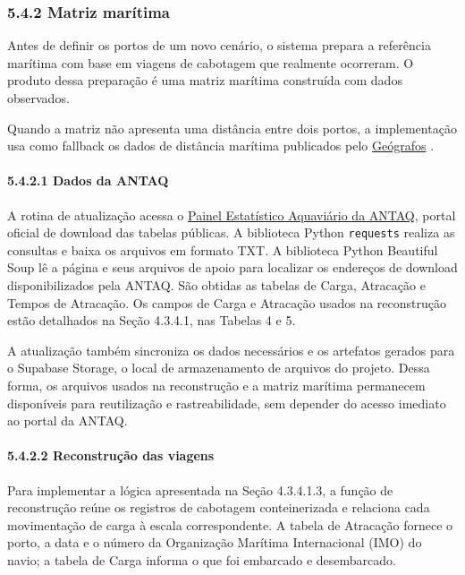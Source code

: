 \documentclass[brazil,]{article}
\let\oldsubsubsection\subsubsection
\renewcommand{\subsubsection}{\Needspace{10\baselineskip}\oldsubsubsection}
\let\oldparagraph\paragraph
\renewcommand{\paragraph}[1]{\Needspace{7\baselineskip}\oldparagraph{#1}\mbox{}}
\begin{document}
\hypertarget{matriz-maruxedtima}{%
\subsubsection{5.4.2 Matriz marítima}\label{matriz-maruxedtima}}

Antes de definir os portos de um novo cenário, o sistema prepara a
referência marítima com base em viagens de cabotagem que realmente
ocorreram. O produto dessa preparação é uma matriz marítima construída
com dados observados.

Quando a matriz não apresenta uma distância entre dois portos, a
implementação usa como fallback os dados de distância marítima publicados
pelo \href{https://www.geografos.com.br/}{Geógrafos}
\parencite{geografos2026}.

\hypertarget{dados-da-antaq}{%
\paragraph{5.4.2.1 Dados da ANTAQ}\label{dados-da-antaq}}

A rotina de atualização acessa o
\href{https://estatistica.antaq.gov.br/ea/sense/download.html}{Painel
Estatístico Aquaviário da ANTAQ}, portal oficial de download das tabelas
públicas. A biblioteca Python \texttt{requests} realiza as consultas e
baixa os arquivos em formato TXT. A biblioteca Python Beautiful Soup lê
a página e seus arquivos de apoio para localizar os endereços de
download disponibilizados pela ANTAQ. São obtidas as tabelas de Carga,
Atracação e Tempos de Atracação. Os campos de Carga e Atracação usados
na reconstrução estão detalhados na Seção 4.3.4.1, nas Tabelas 4 e 5.

A atualização também sincroniza os dados necessários e os artefatos
gerados para o Supabase Storage, o local de armazenamento de arquivos do
projeto. Dessa forma, os arquivos usados na reconstrução e a matriz
marítima permanecem disponíveis para reutilização e rastreabilidade, sem
depender do acesso imediato ao portal da ANTAQ.

\hypertarget{reconstruuxe7uxe3o-das-viagens-1}{%
\paragraph{5.4.2.2 Reconstrução das
viagens}\label{reconstruuxe7uxe3o-das-viagens-1}}

Para implementar a lógica apresentada na Seção 4.3.4.1.3, a função de
reconstrução reúne os registros de cabotagem conteinerizada e relaciona
cada movimentação de carga à escala correspondente. A tabela de
Atracação fornece o porto, a data e o número da Organização Marítima
Internacional (IMO) do navio; a tabela de Carga informa o que foi
embarcado e desembarcado.
\end{document}
